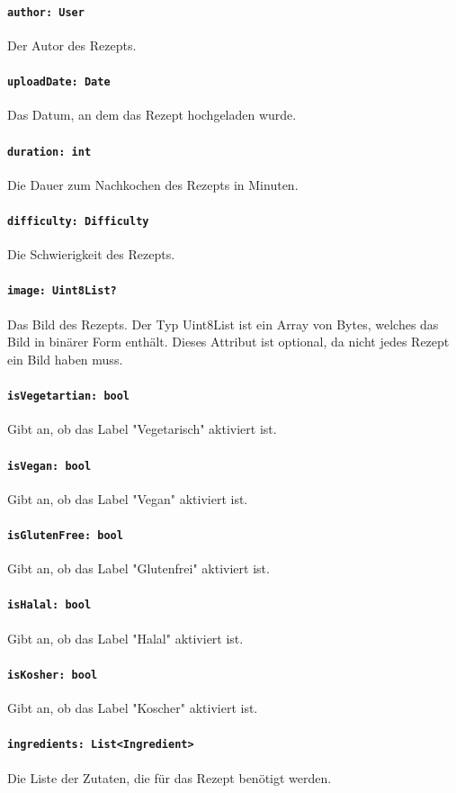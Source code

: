 \documentclass[parskip=full]{scrartcl}
\begin{document}
\paragraph{\texttt{author: User}}
Der Autor des Rezepts.
\paragraph{\texttt{uploadDate: Date}}
Das Datum, an dem das Rezept hochgeladen wurde.
\paragraph{\texttt{duration: int}}
Die Dauer zum Nachkochen des Rezepts in Minuten.
\paragraph{\texttt{difficulty: Difficulty}}
Die Schwierigkeit des Rezepts.
\paragraph{\texttt{image: Uint8List?}}
Das Bild des Rezepts. Der Typ Uint8List ist ein Array von Bytes, welches das Bild in binärer Form enthält. Dieses Attribut ist optional, da nicht jedes Rezept ein Bild haben muss.
\paragraph{\texttt{isVegetartian: bool}}
Gibt an, ob das Label "Vegetarisch" aktiviert ist.
\paragraph{\texttt{isVegan: bool}}
Gibt an, ob das Label "Vegan" aktiviert ist.
\paragraph{\texttt{isGlutenFree: bool}}
Gibt an, ob das Label "Glutenfrei" aktiviert ist.
\paragraph{\texttt{isHalal: bool}}
Gibt an, ob das Label "Halal" aktiviert ist.
\paragraph{\texttt{isKosher: bool}}
Gibt an, ob das Label "Koscher" aktiviert ist.
\paragraph{\texttt{ingredients: List<Ingredient>}}
Die Liste der Zutaten, die für das Rezept benötigt werden.
\end{document}
